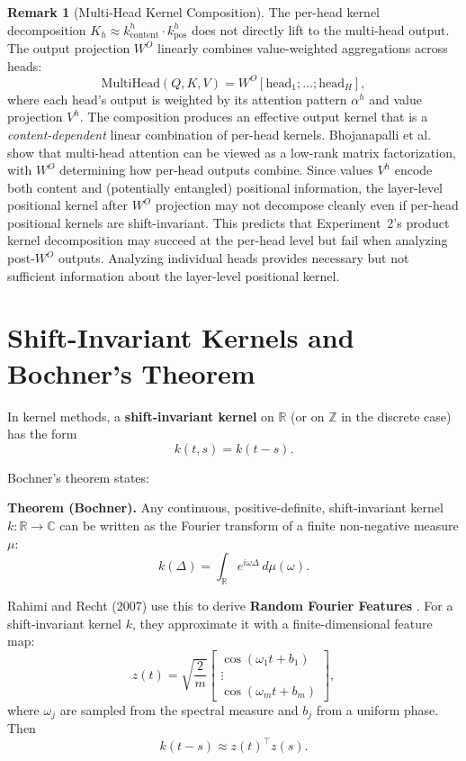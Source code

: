 \documentclass[11pt]{article}
\theoremstyle{definition}
\newtheorem{remark}[theorem]{Remark}
\begin{document}
\begin{remark}[Multi-Head Kernel Composition]
\label{rem:multi-head}
The per-head kernel decomposition $K_h \approx k^h_{\mathrm{content}} \cdot k^h_{\mathrm{pos}}$ does not directly lift to the multi-head output. The output projection $W^O$ linearly combines value-weighted aggregations across heads:
\[
\text{MultiHead}(Q,K,V) = W^O \left[\text{head}_1; \ldots; \text{head}_H\right],
\]
where each head's output is weighted by its attention pattern $\alpha^h$ and value projection $V^h$. The composition produces an effective output kernel that is a \emph{content-dependent} linear combination of per-head kernels. Bhojanapalli et al.\ \cite{bhojanapalli2020lowrank} show that multi-head attention can be viewed as a low-rank matrix factorization, with $W^O$ determining how per-head outputs combine. Since values $V^h$ encode both content and (potentially entangled) positional information, the layer-level positional kernel after $W^O$ projection may not decompose cleanly even if per-head positional kernels are shift-invariant. This predicts that Experiment~2's product kernel decomposition may succeed at the per-head level but fail when analyzing post-$W^O$ outputs. Analyzing individual heads provides necessary but not sufficient information about the layer-level positional kernel.
\end{remark}

\section{Shift-Invariant Kernels and Bochner's Theorem}

In kernel methods, a \textbf{shift-invariant kernel} on \(\mathbb{R}\) (or on \(\mathbb{Z}\) in the discrete case) has the form
\[
k(t,s) = k(t-s).
\]

Bochner's theorem states:

\medskip
\noindent
\textbf{Theorem (Bochner).} Any continuous, positive-definite, shift-invariant kernel \(k : \mathbb{R} \to \mathbb{C}\) can be written as the Fourier transform of a finite non-negative measure \(\mu\):
\[
k(\Delta) = \int_{\mathbb{R}} e^{i\omega \Delta} \, d\mu(\omega).
\]

Rahimi and Recht (2007) use this to derive \textbf{Random Fourier Features} \cite{rahimi2007random}. For a shift-invariant kernel \(k\), they approximate it with a finite-dimensional feature map:
\[
z(t) = \sqrt{\frac{2}{m}}
\begin{bmatrix}
\cos(\omega_1 t + b_1) \\
\vdots \\
\cos(\omega_m t + b_m)
\end{bmatrix},
\]
where \(\omega_j\) are sampled from the spectral measure and \(b_j\) from a uniform phase. Then
\[
k(t-s) \approx z(t)^\top z(s).
\]
\end{document}
